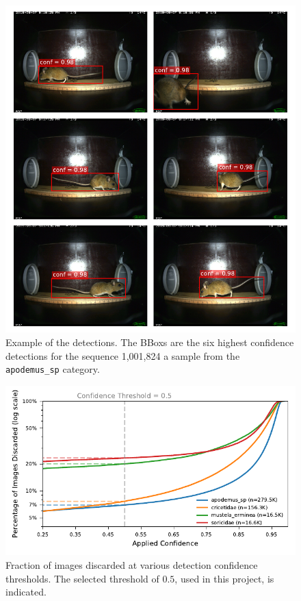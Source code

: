         \begin{figure}[p]
        \centering
        \includegraphics{figures/detections_on_a_sequence.pdf}
        \caption{Example of the detections. The \acsp{BBox} are the six highest confidence detections for the sequence 1,001,824 a sample from the \texttt{apodemus\_sp} category.}
        \label{fig:detection_example}
        \end{figure}

        \begin{figure}[ht]
        \centering
        \includegraphics{figures/discarded_img_by_conf.pdf}
        \caption{
            Fraction of images discarded at various detection confidence thresholds.
            The selected threshold of \(0.5\), used in this project, is indicated.
            }
        \label{fig:lost_images}
        \end{figure}        

